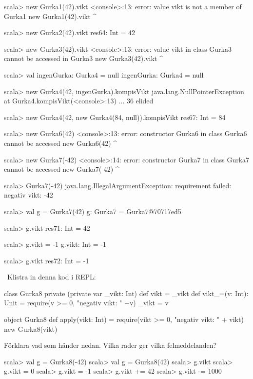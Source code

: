 \SubtaskSolved
\begin{REPL}
scala> new Gurka1(42).vikt
<console>:13: error: value vikt is not a member of Gurka1
       new Gurka1(42).vikt
                      ^

scala> new Gurka2(42).vikt
res64: Int = 42

scala> new Gurka3(42).vikt
<console>:13: error: value vikt in class Gurka3 cannot be accessed in Gurka3
       new Gurka3(42).vikt
                      ^

scala> val ingenGurka: Gurka4 = null
ingenGurka: Gurka4 = null

scala> new Gurka4(42, ingenGurka).kompisVikt
java.lang.NullPointerException
  at Gurka4.kompisVikt(<console>:13)
  ... 36 elided

scala> new Gurka4(42, new Gurka4(84, null)).kompisVikt
res67: Int = 84

scala> new Gurka6(42)
<console>:13: error: constructor Gurka6 in class Gurka6 cannot be accessed
       new Gurka6(42)
       ^

scala> new Gurka7(-42)
<console>:14: error: constructor Gurka7 in class Gurka7 cannot be accessed
       new Gurka7(-42)
       ^

scala> Gurka7(-42)
java.lang.IllegalArgumentException: requirement failed: negativ vikt: -42


scala> val g = Gurka7(42)
g: Gurka7 = Gurka7@70717ed5

scala> g.vikt
res71: Int = 42

scala> g.vikt = -1
g.vikt: Int = -1

scala> g.vikt
res72: Int = -1
\end{REPL}

\QUESTEND






\QUESTBEGIN

\Task  \what~Klistra in denna kod i REPL:

\begin{Code}
class Gurka8 private (private var _vikt: Int) {
  def vikt = _vikt
  def vikt_=(v: Int): Unit = {
    require(v >= 0, "negativ vikt: " +v)
    _vikt = v
  }
}

object Gurka8 {
  def apply(vikt: Int) = {
    require(vikt >= 0, "negativ vikt: " + vikt)
    new Gurka8(vikt)
  }
}
\end{Code}


\Subtask Förklara vad som händer nedan. Vilka rader ger vilka felmeddelanden?
\begin{REPL}
scala> val g = Gurka8(-42)
scala> val g = Gurka8(42)
scala> g.vikt
scala> g.vikt = 0
scala> g.vikt = -1
scala> g.vikt += 42
scala> g.vikt -= 1000
\end{REPL}

